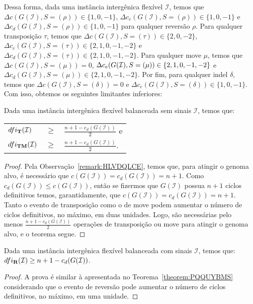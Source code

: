 Dessa forma, dada uma instância intergênica flexível $\mathcal{I}$, temos que $\Delta c(G(\mathcal{I}), S=(\rho)) \in \{1,0,-1\}$, $\Delta c_e(G(\mathcal{I}), S=(\rho)) \in \{1,0,-1\}$ e $\Delta c_d(G(\mathcal{I}), S=(\rho)) \in \{1,0,-1\}$ para qualquer reversão $\rho$. Para qualquer transposição $\tau$, temos que $\Delta c(G(\mathcal{I}), S=(\tau)) \in \{2,0,-2\}$, $\Delta c_e(G(\mathcal{I}), S=(\tau)) \in \{2,1,0,-1,-2\}$ e $\Delta c_d(G(\mathcal{I}), S=(\tau)) \in \{2,1,0,-1,-2\}$. Para qualquer move $\mu$, temos que $\Delta c(G(\mathcal{I}), S=(\mu)) = 0$, $\Delta c_e(G(\mathcal{I}), S=(\mu)) \in \{2,1,0,-1,\break-2\}$ e $\Delta c_d(G(\mathcal{I}), S=(\mu)) \in \{2,1,0,-1,-2\}$. Por fim, para qualquer indel $\delta$, temos que $\Delta c(G(\mathcal{I}), S=(\delta)) = 0$ e $\Delta c_e(G(\mathcal{I}), S=(\delta)) \in \{1,0,{-1}\}$. Com isso, obtemos os seguintes limitantes inferiores:

\begin{theorem}\label{theorem:PQQUYBMS}
Dada uma instância intergênica flexível balanceada sem sinais $\mathcal{I}$, temos que:

\begin{tabular}{lll}
  $dfi_{\textbf{T}}(\mathcal{I})$      & $ \ge $ & $\frac{{n+1} - c_d(G(\mathcal{I} ))}{2}$ e \\
  $dfi_{\textbf{TM}}(\mathcal{I})$     & $ \ge $ & $\frac{{n+1} - c_d(G(\mathcal{I} ))}{2}$.  \\
\end{tabular}
\end{theorem}
\begin{proof}
Pela Observação~\ref{remark:HLVDQLCE}, temos que, para atingir o genoma alvo, é necessário que $c(G(\mathcal{I})) = c_d(G(\mathcal{I})) = n+1$. Como $c_d(G(\mathcal{I})) \le c(G(\mathcal{I}))$, então se fizermos que $G(\mathcal{I})$ possua $n+1$ ciclos definitivos temos, garantidamente, que $c(G(\mathcal{I})) = c_d(G(\mathcal{I})) = n+1$. Tanto o evento de transposição como o de move podem aumentar o número de ciclos definitivos, no máximo, em duas unidades. Logo, são necessárias pelo menos $\frac{{n+1} - c_d(G(\mathcal{I} ))}{2}$ operações de transposição ou move para atingir o genoma alvo, e o teorema segue. 
\end{proof}

\begin{theorem}\label{theorem:EUNBEQEX}
Dada uma instância intergênica flexível balanceada com sinais $\mathcal{I}$, temos que: $dfi_{\textbf{R}}(\mathcal{I}) \ge {n+1} - c_d(G(\mathcal{I} ))$.
\end{theorem}
\begin{proof}
A prova é similar à apresentada no Teorema~\ref{theorem:PQQUYBMS} considerando que o evento de reversão pode aumentar o número de ciclos definitivos, no máximo, em uma unidade.
\end{proof}

